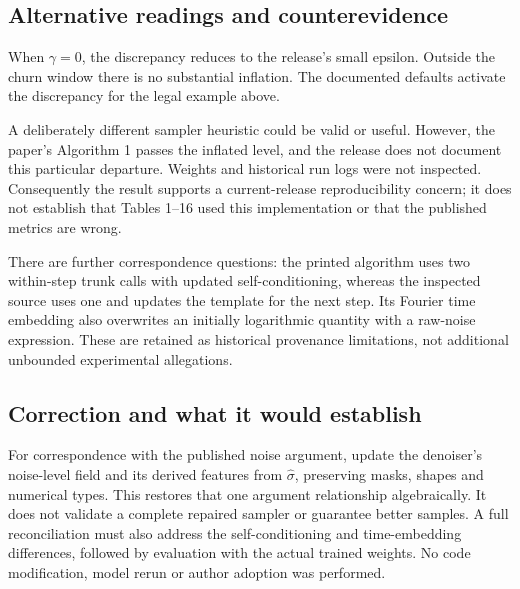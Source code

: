 \documentclass[10pt]{article}
\begin{document}
\subsection*{Alternative readings and counterevidence}
When \(\gamma=0\), the discrepancy reduces to the release’s small epsilon. Outside the churn window there is no substantial inflation. The documented defaults activate the discrepancy for the legal example above.\par
A deliberately different sampler heuristic could be valid or useful. However, the paper’s Algorithm 1 passes the inflated level, and the release does not document this particular departure. Weights and historical run logs were not inspected. Consequently the result supports a current-release reproducibility concern; it does not establish that Tables 1–16 used this implementation or that the published metrics are wrong.\par
There are further correspondence questions: the printed algorithm uses two within-step trunk calls with updated self-conditioning, whereas the inspected source uses one and updates the template for the next step. Its Fourier time embedding also overwrites an initially logarithmic quantity with a raw-noise expression. These are retained as historical provenance limitations, not additional unbounded experimental allegations.\par
\subsection*{Correction and what it would establish}
For correspondence with the published noise argument, update the denoiser’s noise-level field and its derived features from \(\widehat{\sigma}\), preserving masks, shapes and numerical types. This restores that one argument relationship algebraically. It does not validate a complete repaired sampler or guarantee better samples. A full reconciliation must also address the self-conditioning and time-embedding differences, followed by evaluation with the actual trained weights. No code modification, model rerun or author adoption was performed.\par
\end{document}
